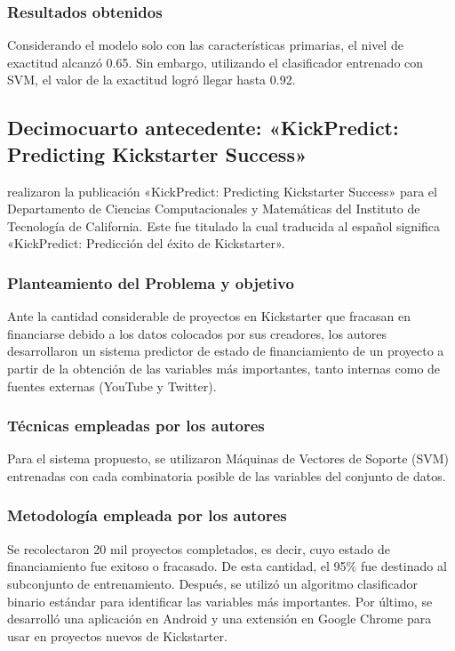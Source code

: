 \subsubsection{Resultados obtenidos}
Considerando el modelo solo con las características primarias, el nivel de exactitud alcanzó 0.65. Sin embargo, utilizando el clasificador entrenado con SVM, el valor de la exactitud logró llegar hasta 0.92.

\subsection{Decimocuarto antecedente: «KickPredict: Predicting Kickstarter Success» \citep*{pr_chen2013kickpredict}}
\citeauthor{pr_chen2013kickpredict} realizaron la publicación «KickPredict: Predicting Kickstarter Success» para el Departamento de Ciencias Computacionales y Matemáticas del Instituto de Tecnología de California. Este fue titulado  la cual traducida al español significa «KickPredict: Predicción del éxito de Kickstarter».

\subsubsection{Planteamiento del Problema y objetivo}
Ante la cantidad considerable de proyectos en Kickstarter que fracasan en financiarse debido a los datos colocados por sus creadores, los autores desarrollaron un sistema predictor de estado de financiamiento de un proyecto a partir de la obtención de las variables más importantes, tanto internas como de fuentes externas (YouTube y Twitter).

\subsubsection{Técnicas empleadas por los autores}
Para el sistema propuesto, se utilizaron Máquinas de Vectores de Soporte (SVM) entrenadas con cada combinatoria posible de las variables del conjunto de datos.

\subsubsection{Metodología empleada por los autores}
Se recolectaron 20 mil proyectos completados, es decir, cuyo estado de financiamiento fue exitoso o fracasado. De esta cantidad, el 95\% fue destinado al subconjunto de entrenamiento. Después, se utilizó un algoritmo clasificador binario estándar para identificar las variables más importantes. Por último, se desarrolló una aplicación en Android y una extensión en Google Chrome para usar en proyectos nuevos de Kickstarter.

